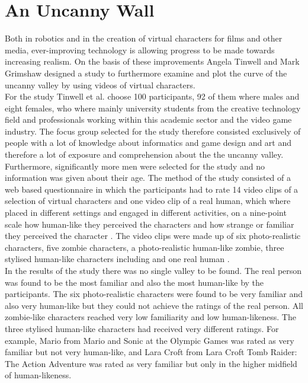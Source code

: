 \section{An Uncanny Wall}
Both in robotics and in the creation of virtual characters for films and other media, ever-improving technology is allowing progress to be made towards increasing realism. On the basis of these improvements Angela Tinwell and Mark Grimshaw \cite{uncanny_wall} designed a study to furthermore examine and plot the curve of the uncanny valley by using videos of virtual characters.\\
For the study Tinwell et al. \cite{uncanny_wall} choose 100 participants, 92 of them where males and eight females, who where mainly university students from the creative technology field and professionals working within this academic sector and the video game industry. The focus group selected for the study therefore consisted exclusively of people with a lot of knowledge about informatics and game design and art and therefore a lot of exposure and comprehension about the the uncanny valley. Furthermore, significantly more men were selected for the study and no information was given about their age. The method of the study consisted of a web based questionnaire in which the participants had to rate 14 video clips of a selection of virtual characters and one video clip of a real human, which where placed in different settings and engaged in different activities, on a nine-point scale how human-like they perceived the characters and how strange or familiar they perceived the character \cite{uncanny_wall}. The video clips were made up of six photo-realistic characters, five zombie characters, a photo-realistic human-like zombie, three stylised human-like characters including and one real human \cite{uncanny_wall}.\\
In the results of the study there was no single valley to be found. The real person was found to be the most familiar and also the most human-like by the participants. The six photo-realistic characters were found to be very familiar and also very human-like but they could not achieve the ratings of the real person. All zombie-like characters reached very low familiarity and low human-likeness. The three stylised human-like characters had received very different ratings. For example, Mario from Mario and Sonic at the Olympic Games was rated as very familiar but not very human-like, and Lara Croft from Lara Croft Tomb Raider: The Action Adventure was rated as very familiar but only  in the higher midfield of human-likeness. 
